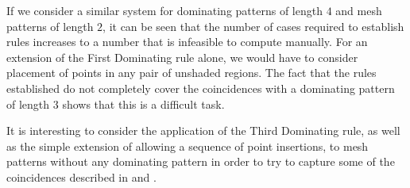 If we consider a similar system for dominating patterns of length \(4\) and
mesh patterns of length \(2\), it can be seen that the number of cases required
to establish rules increases to a number that is infeasible to compute manually.
For an extension of the First Dominating rule alone, we would have to consider
placement of points in any pair of unshaded regions. The fact that the rules
established do not completely cover the coincidences with a dominating pattern
of length \(3\) shows that this is a difficult task.

It is interesting to consider the application of the Third Dominating rule, as well as the simple
extension of allowing a sequence of point insertions, to mesh patterns without any dominating
pattern in order to try to capture some of the coincidences described in
\textcite{DBLP:journals/combinatorics/HilmarssonJSVU15} and
\textcite{DBLP:journals/corr/ClaessonTU14}.
